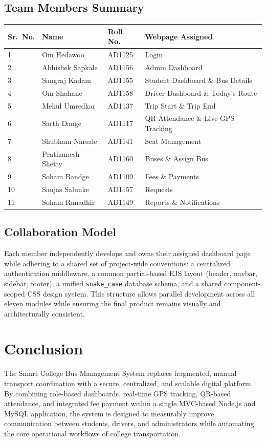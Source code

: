 \documentclass[11pt,a4paper]{report}
\begin{document}
\section{Team Members Summary}
\begin{longtable}{@{}p{1.4cm}p{4cm}p{2.4cm}p{5.3cm}@{}}
\toprule
\rowcolor{pine!10}\textbf{Sr.\ No.} & \textbf{Name} & \textbf{Roll No.} & \textbf{Webpage Assigned} \\
\midrule
\endhead
1 & Om Hedawoo & AD1125 & Login \\
2 & Abhishek Sapkale & AD1156 & Admin Dashboard \\
3 & Sangraj Kadam & AD1155 & Student Dashboard \& Bus Details \\
4 & Om Shahane & AD1158 & Driver Dashboard \& Today's Route \\
5 & Mehul Umredkar & AD1137 & Trip Start \& Trip End \\
6 & Sarth Dange & AD1117 & QR Attendance \& Live GPS Tracking \\
7 & Shubham Narsale & AD1141 & Seat Management \\
8 & Prathamesh Shetty & AD1160 & Buses \& Assign Bus \\
9 & Soham Bandge & AD1109 & Fees \& Payments \\
10 & Saujas Salunke & AD1157 & Requests \\
11 & Soham Ranadhir & AD1149 & Reports \& Notifications \\
\bottomrule
\end{longtable}

\section{Collaboration Model}
Each member independently develops and owns their assigned dashboard page while adhering to a shared set of project-wide conventions: a centralized authentication middleware, a common partial-based EJS layout (header, navbar, sidebar, footer), a unified \texttt{snake\_case} database schema, and a shared component-scoped CSS design system. This structure allows parallel development across all eleven modules while ensuring the final product remains visually and architecturally consistent.

\chapter{Conclusion}
The Smart College Bus Management System replaces fragmented, manual transport coordination with a secure, centralized, and scalable digital platform. By combining role-based dashboards, real-time GPS tracking, QR-based attendance, and integrated fee payment within a single MVC-based Node.js and MySQL application, the system is designed to measurably improve communication between students, drivers, and administrators while automating the core operational workflows of college transportation.
\end{document}
